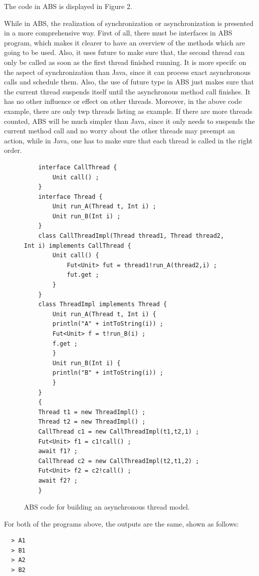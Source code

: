 \documentclass[article,dr=phil,type=msc,colorback,accentcolor=tud9c]{tudthesis}
\begin{document}
\begin{itemize}
  The code in ABS is displayed in Figure 2.

  While in ABS, the realization of synchronization or asynchronization is presented in a more comprehensive way. First of all, there must be interfaces in ABS program, which makes it clearer to have an overview of the methods which are going to be used. Also, it uses future to make sure that, the second thread can only be called as soon as the first thread finished running. It is more specifc on the aspect of synchronization than Java, since it can process exact asynchronous calls and schedule them. Also, the use of future type in ABS just makes sure that the current thread suspends itself until the asynchronous method call finishes. It has no other influence or effect on other threads. Moreover, in the above code example, there are only twp threads listing as example. If there are more threads counted, ABS will be much simpler than Java, since it only needs to suspends the current method call and no worry about the other threads may preempt an action, while in Java, one has to make sure that each thread is called in the right order.
  
  \begin{figure}[H]
	\begin{lstlisting}
	interface CallThread {
		Unit call() ;
	}	
	interface Thread {
		Unit run_A(Thread t, Int i) ;
		Unit run_B(Int i) ;
	}
	class CallThreadImpl(Thread thread1, Thread thread2, Int i) implements CallThread {
		Unit call() {
			Fut<Unit> fut = thread1!run_A(thread2,i) ;
			fut.get ;
		}
	}	
	class ThreadImpl implements Thread {
		Unit run_A(Thread t, Int i) {
		println("A" + intToString(i)) ;
		Fut<Unit> f = t!run_B(i) ;
		f.get ;
		}
		Unit run_B(Int i) {
		println("B" + intToString(i)) ;
		}
	}
	{
	Thread t1 = new ThreadImpl() ;
	Thread t2 = new ThreadImpl() ;
	CallThread c1 = new CallThreadImpl(t1,t2,1) ; 
	Fut<Unit> f1 = c1!call() ;
	await f1? ;
	CallThread c2 = new CallThreadImpl(t2,t1,2) ;
	Fut<Unit> f2 = c2!call() ;
	await f2? ;
	}\end{lstlisting}
	\caption[Caption for LOF]{ABS code for building an asynchronous thread model.}
  \end{figure} 



  For both of the programs above, the outputs are the same, shown as follows:
  
  \begin{verbatim}
  > A1
  > B1
  > A2
  > B2
  \end{verbatim}
  

\end{itemize}
\end{document}
